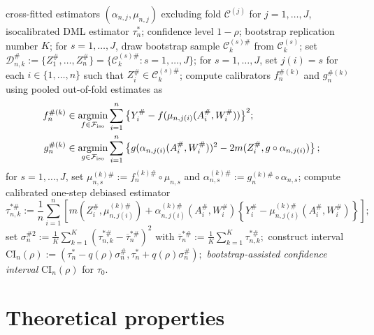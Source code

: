 \documentclass[11pt]{article}
\newcommand{\INPUT}{\item[\textbf{Input:}]}
\theoremstyle{plain}
\DeclareMathOperator*{\argmin}{argmin}
\begin{document}
\begin{algorithm}[!htb]
\caption{Bootstrap-assisted doubly robust CIs}
\label{alg::bootstrap}
\begin{algorithmic}[1]
\small 
\INPUT cross-fitted estimators $(\alpha_{n,j}, \mu_{n,j})$ excluding fold $\mathcal{C}^{(j)}$ for $j=1,\ldots,J$,  isocalibrated DML estimator $\tau_n^*$; confidence level $1-\rho$; bootstrap replication number $K$;
\STATE for {$s = 1,\ldots,J$}, draw bootstrap sample $\mathcal{C}_{k}^{(s)\#}$ from $\mathcal{C}_k^{(s)}$;
\STATE set $\mathcal{D}_{n,k}^{\#} :=  \{Z_1^{\#}, \dots, Z_n^{\#}\} = \{\mathcal{C}_{k}^{(s)\#}: s=1,\ldots,J\} $;
\STATE for {$s = 1,\ldots,J$}, set $j(i)=s$ for each $i\in\{1,\ldots,n\}$ such that $Z_i^{\#} \in \mathcal{C}_k^{(s)\#}$;
\STATE compute calibrators $f^{\#(k)}_n$ and $g^{\#(k)}_n$ using pooled out-of-fold estimates as\vspace{-.05in}
\begin{align*}
f_n^{\#(k)} &\in \argmin_{f \in \mathcal{F}_{\text{iso}}} \sum_{i =1}^n \big{\{} Y_{i}^{\#} - f(\mu_{n,j(i)}(A_i^{\#}, W_i^{\#}))\big{\}}^2;\\
g_n^{\#(k)} &\in \argmin_{g \in \mathcal{F}_{\text{iso}}} \sum_{i =1}^n \big{\{}g (\alpha_{n,j(i)}(A_i^{\#}, W_i^{\#}))^2 - 2m(Z_i^{\#},  g \circ \alpha_{n,j(i)})\big{\}}\,;
\end{align*}\vspace{-.05in}
\STATE for {$s = 1,\ldots,J$}, set $  \mu_{n,s}^{(k)\#}  := f_n^{(k)\#} \circ \mu_{n,s} $ and $  \alpha_{n,s}^{(k)\#} := g_n^{(k)\#} \circ \alpha_{n,s} $;
\STATE compute calibrated one-step debiased estimator
$$\tau_{n,k}^{*\#} := \frac{1}{n} \sum_{i =1}^n \left[ m(Z_i^{\#}, \mu_{n,j(i)}^{(k)\#})  +  \alpha_{n,j(i)}^{(k)\#}(A_i^{\#}, W_i^{\#})\left\{Y_i^{\#} - \mu_{n,j(i)}^{(k)\#}(A_i^{\#},W_i^{\#})\right\}\right];$$
\ENDFOR 
\STATE set $\sigma_n^{\# 2} := \frac{1}{K}\sum_{k=1}^K (\tau_{n,k}^{*\#} - \overline{\tau}_n^{*\#})^2$ with $\overline{\tau}_n^{*\#} := \frac{1}{K}\sum_{k=1}^K \tau_{n,k}^{*\#};$
\STATE construct interval $\text{CI}_n(\rho) := (\tau_n^* - q(\rho)\sigma_n^{\#},\tau_n^* + q(\rho)\sigma_n^{\#});$  
\RETURN  \textit{bootstrap-assisted confidence interval} $\text{CI}_n(\rho)$ for $\tau_0$.
\end{algorithmic}
\end{algorithm}

 
 





\section{Theoretical properties}
 \label{section::theory}
\end{document}
